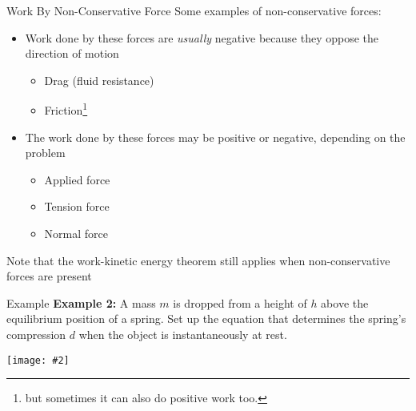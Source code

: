 \documentclass[12pt,compress,aspectratio=169]{beamer}
\newcommand{\pic}[2]{\texttt{[image: \#2]}}
\begin{document}
\begin{frame}{Work By Non-Conservative Force}
  Some examples of non-conservative forces:
  \begin{itemize}
  \item Work done by these forces are \emph{usually} negative because they
    oppose the direction of motion
    \begin{itemize}
    \item Drag (fluid resistance)
    \item Friction\footnote{but sometimes it can also do positive work too.}
    \end{itemize}
  \item The work done by these forces may be positive or negative, depending on
    the problem
    \begin{itemize}
    \item Applied force
    \item Tension force
    \item Normal force
    \end{itemize}
  \end{itemize}
  Note that the work-kinetic energy theorem still applies when non-conservative
  forces are present
  \vspace{.25in}
\end{frame}


\begin{frame}{Example}
  \textbf{Example 2:} A mass $m$ is dropped from a height of $h$ above the
  equilibrium position of a spring. Set up the equation that determines the
  spring's compression $d$ when the object is instantaneously at rest.
  \begin{center}
    \pic{.35}{spring-example1.png}
  \end{center}
\end{frame}


\end{document}

